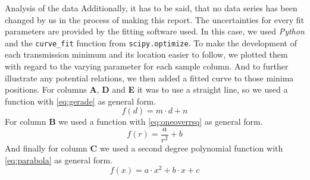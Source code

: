 \documentclass[pdftex, a4paper,11pt, twoside, UKenglish]{report}
\begin{document}
\begin{chapter}{Analysis of the data}
    Additionally, it has to be said, that no data series has been changed by us
    in the process of making this report. The uncertainties for every fit
    parameters are provided by the fitting software used.
    In this case, we used \textit{Python} and the \texttt{curve\_fit} function
    from \texttt{scipy.optimize}.
    To make the development of each transmission minimum and its location
    easier to follow, we plotted them with regard to the varying parameter for
    each sample column. And to further illustrate any potential relations, we
    then added a fitted curve to those minima positions.
    For columns \textbf{A}, \textbf{D} and \textbf{E} it was to use a
    straight line, so we used a function with \cref{eq:gerade} as general form.
    \begin{equation}
      \label{eq:gerade}
      f(d) = m\cdot d + n
    \end{equation}
    For column \textbf{B} we used a function with \cref{eq:oneoverrsq} as
    general form.
    \begin{equation}
      \label{eq:oneoverrsq}
      f(r) = \frac{a}{r^{2}}+b
    \end{equation}
    And finally for column \textbf{C} we used a second degree polynomial
    function with \cref{eq:parabola} as general form.
    \begin{equation}
      \label{eq:parabola}
      f(x) = a\cdot x^{2} + b\cdot x + c
    \end{equation}
    
    
    

\end{chapter}
\end{document}
